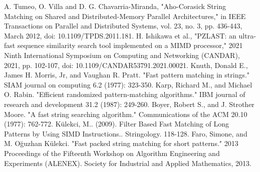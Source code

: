 \documentclass[11pt]{article}       %
\begin{document}
\begin{thebibliography}{99}
A. Tumeo, O. Villa and D. G. Chavarria-Miranda, "Aho-Corasick String Matching on Shared and Distributed-Memory Parallel Architectures," in IEEE Transactions on Parallel and Distributed Systems, vol. 23, no. 3, pp. 436-443, March 2012, doi: 10.1109/TPDS.2011.181.
H. Ishikawa et al., "PZLAST: an ultra-fast sequence similarity search tool implemented on a MIMD processor," 2021 Ninth International Symposium on Computing and Networking (CANDAR), 2021, pp. 102-107, doi: 10.1109/CANDAR53791.2021.00021.
Knuth, Donald E., James H. Morris, Jr, and Vaughan R. Pratt. "Fast pattern matching in strings." SIAM journal on computing 6.2 (1977): 323-350.
Karp, Richard M., and Michael O. Rabin. "Efficient randomized pattern-matching algorithms." IBM journal of research and development 31.2 (1987): 249-260.
Boyer, Robert S., and J. Strother Moore. "A fast string searching algorithm." Communications of the ACM 20.10 (1977): 762-772.
Külekci, M.. (2009). Filter Based Fast Matching of Long Patterns by Using SIMD Instructions.. Stringology. 118-128. 
Faro, Simone, and M. Oğuzhan Külekci. "Fast packed string matching for short patterns." 2013 Proceedings of the Fifteenth Workshop on Algorithm Engineering and Experiments (ALENEX). Society for Industrial and Applied Mathematics, 2013.
\end{thebibliography}

\end{document}
